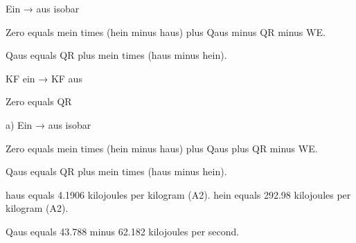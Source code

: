 Ein → aus isobar  

Zero equals mein times (hein minus haus) plus Qaus minus QR minus WE.  

Qaus equals QR plus mein times (haus minus hein).  

KF ein → KF aus  

Zero equals QR  

a) Ein → aus isobar  

Zero equals mein times (hein minus haus) plus Qaus plus QR minus WE.  

Qaus equals QR plus mein times (haus minus hein).  

haus equals 4.1906 kilojoules per kilogram (A2).  
hein equals 292.98 kilojoules per kilogram (A2).  

Qaus equals 43.788 minus 62.182 kilojoules per second.